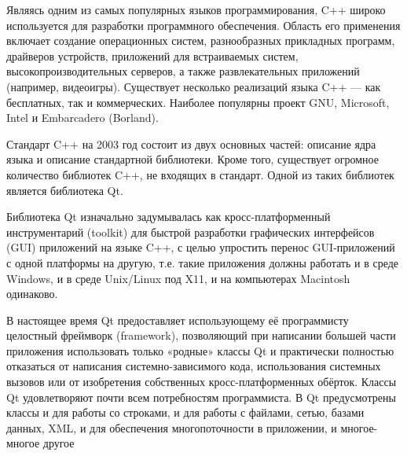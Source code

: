 \documentclass[12pt,a4paper,oneside]{article} %
\begin{document}
Являясь одним из самых популярных языков программирования, \linebreak
C++ широко используется для разработки программного обеспечения. \linebreak
Область его применения включает создание операционных систем, \linebreak
разнообразных прикладных программ, драйверов устройств, приложений \linebreak
для встраиваемых систем, высокопроизводительных серверов, а также \linebreak
развлекательных приложений (например, видеоигры). Существует \linebreak
несколько реализаций языка C++ — как бесплатных, так и \linebreak
коммерческих. Наиболее популярны проект GNU, Microsoft, Intel и Embarcadero (Borland).

Стандарт C++ на 2003 год состоит из двух основных частей: описание \linebreak
ядра языка и описание стандартной библиотеки. Кроме того, существует \linebreak
огромное количество библиотек C++, не входящих в стандарт. \linebreak
Одной из таких библиотек является библиотека Qt.

Библиотека Qt изначально задумывалась как кросс-платформенный \linebreak
инструментарий (toolkit) для быстрой разработки графических \linebreak
интерфейсов (GUI) приложений на языке C++, с целью упростить \linebreak
перенос GUI-приложений с одной платформы на другую, т.е. такие \linebreak
приложения должны работать и в среде Windows, и в среде Unix/Linux \linebreak
под X11, и на компьютерах Macintosh одинаково.

В настоящее время Qt предоставляет использующему её программисту \linebreak
целостный фреймворк (framework), позволяющий при написании \linebreak
большей части приложения использовать только «родные» классы Qt \linebreak
и практически полностью отказаться от написания системно-зависимого \linebreak
кода, использования системных вызовов или от изобретения \linebreak
собственных кросс-платформенных обёрток. Классы Qt удовлетворяют \linebreak
почти всем потребностям программиста. В Qt предусмотрены классы и \linebreak
для работы со строками, и для работы с файлами, сетью, базами \linebreak
данных, XML, и для обеспечения многопоточности в приложении, и \linebreak
многое-многое другое
\end{document}
